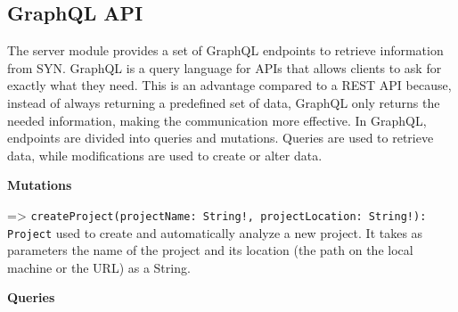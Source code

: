 \subsection*{GraphQL API} 
The server module provides a set of GraphQL endpoints to retrieve information from SYN. 
GraphQL is a query language for APIs that allows clients to ask for exactly what they need.
This is an advantage compared to a REST API because, instead of always returning a predefined set of data, GraphQL only returns the needed information, making the communication more effective. 
In GraphQL, endpoints are divided into queries and mutations. Queries are used to retrieve data, while modifications are used to create or alter data. 

\bigbreak
\textbf{Mutations}

=> \texttt{createProject(projectName: String!, projectLocation: String!): Project} 
used to create and automatically analyze a new project.
It takes as parameters the name of the project and its location (the path on the local machine or the URL) as a String. 

\bigbreak
\textbf{Queries}

